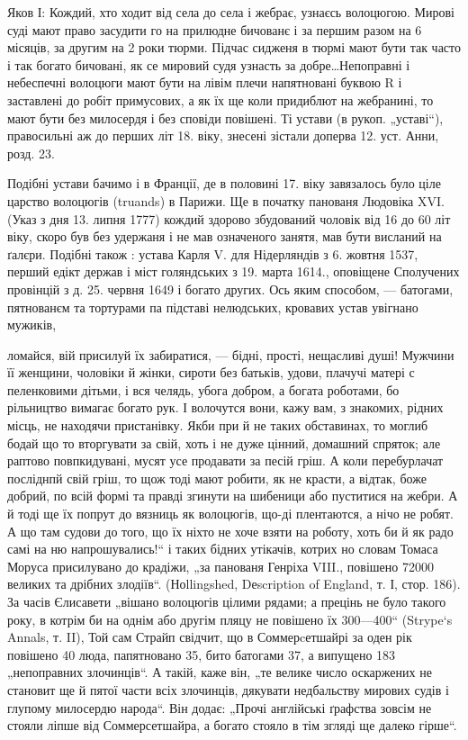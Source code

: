 Яков І: Кождий, хто ходит від села до села і жебрає,
узнаєсь волоцюгою. Мирові суді мают право засудити го на
прилюдне бичованє і за першим разом на 6 місяців, за
другим на 2 роки тюрми. Підчас сидженя в тюрмі мают
бути так часто і так богато бичовані, як се мировий судя
узнасть за добре\dots Непоправні і небеспечні волоцюги мают
бути на лівім плечи напятновані буквою R і заставлені до
робіт примусових, а як їх ще коли придиблют на жебранині,
то мают бути без милосердя і без сповіди повішені. Ті устави
(в рукоп. „уставі“), правосильні аж до перших літ 18. віку,
знесені зістали доперва 12. уст. Анни, розд. 23.

Подібні устави бачимо і в Франції, де в половині 17.
віку завязалось було ціле царство волоцюгів (truands) в Парижи.
Ще в початку панованя Людовіка XVI. (Указ з дня
13. липня 1777) кождий здорово збудований чоловік від 16
до 60 літ віку, скоро був без удержаня і не мав означеного
занятя, мав бути висланий на ґалєри. Подібні також : устава
Карля V. для Нідерляндів з 6. жовтня 1537, перший едікт
держав і міст голяндських з 19. марта 1614., оповіщене Сполучених
провінцій з д. 25. червня 1649 і богато других.
Ось яким способом, — батогами, пятнованєм та тортурами
па підставі нелюдських, кровавих устав увігнано мужиків,

ломайся, вій присилуй їх забиратися, — бідні, прості, нещасливі душі!
Мужчини її женщини, чоловіки й жінки, сироти без батьків, удови, плачучі
матері с пеленковими дітьми, і вся челядь, убога добром, а богата
роботами, бо рільництво вимагає богато рук. І волочутся вони, кажу вам,
з знакомих, рідних місць, не находячи пристанівку. Якби при й не таких
обставинах, то моглиб бодай що то вторгувати за свій, хоть і не дуже
цінний, домашний спряток; але раптово повпкидувані, мусят усе продавати
за песій гріш. А коли перебурлачат посліднпй свій гріш, то щож
тоді мают робити, як не красти, а відтак, боже добрий, по всій формі та
правді згинути на шибеници або пуститися на жебри. А й тоді ще їх
попрут до вязниць як волоцюгів, що-ді плентаются, а нічо не робят.
А що там судови до того, що їх ніхто не хоче взяти на роботу, хоть би
й як радо самі на ню напрошувались!“ і таких бідних утікачів, котрих
но словам Томаса Моруса присилувано до крадіжи, „за панованя Генріха
VIII., повішено 72000 великих та дрібних злодіїв“. (Ноllingshed, Dеscription
of England, т. І, стор. 186). За часів Єлисавети „вішано волоцюгів
цілими рядами; а прецінь не було такого року, в котрім би на
однім або другім пляцу не повішено їх 300—400“ (Strype`s Annals, т. II),
Той сам Страйп свідчит, що в Соммерcетшайрі за оден рік повішено 40
люда, папятновано 35, бито батогами 37, а випущено 183 „непоправних
злочинців“. А такій, каже він, „те велике число оскаржених не становит
ще й пятої части всіх злочинців, дякувати недбальству мирових судів
і глупому милосердю народа“. Він додає: „Прочі англійські ґрафства
зовсім не стояли ліпше від Соммерсетшайра, а богато стояло в тім згляді
ще далеко гірше“.

